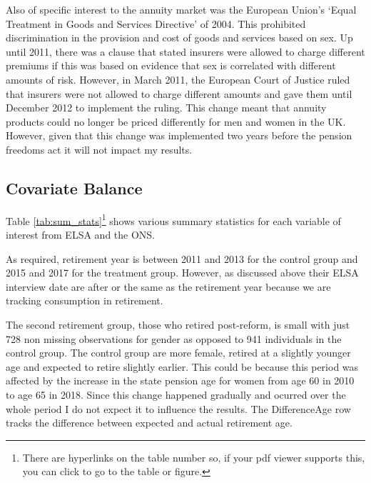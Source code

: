 \documentclass[12pt]{article}
\begin{document}
Also of specific interest to the annuity market was the European Union's `Equal
Treatment in Goods and Services Directive' of 2004. This prohibited
discrimination in the provision and cost of goods and services based on sex. Up
until 2011, there was a clause that stated insurers were allowed to charge
different premiums if this was based on evidence that sex is correlated with
different amounts of risk. However, in March 2011, the European Court of Justice
ruled that insurers were not allowed to charge different amounts and gave them
until December 2012 to implement the ruling. This change meant that annuity
products could no longer be priced differently for men and women in the UK.
However, given that this change was implemented two years before the pension
freedoms act it will not impact my results.



\subsection{Covariate Balance}

Table \ref{tab:sum_stats}\footnote{There are hyperlinks on the table number so,
    if your pdf viewer supports this, you can click to go to the table or
    figure.} shows various summary statistics for each variable of interest from
ELSA and the ONS.

As required, retirement year is between 2011 and 2013 for the control group and
2015 and 2017 for the treatment group. However, as discussed above their ELSA
interview date are after or the same as the retirement year because we are
tracking consumption in retirement.

The second retirement group, those who retired post-reform, is small with just
728 non missing observations for gender as opposed to 941 individuals in the
control group. The control group are more female, retired at a slightly younger
age and expected to retire slightly earlier. This could be because this period
was affected by the increase in the state pension age for women from age 60 in
2010 to age 65 in 2018. Since this change happened gradually and ocurred over
the whole period I do not expect it to influence the results. The DifferenceAge
row tracks the difference between expected and actual retirement age.
\end{document}
